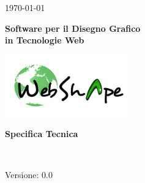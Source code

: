 \usepackage{multirow}
\title{\TITOLODOC}
\author{Dal Bosco Davide}



\renewcommand{\insertversion}{0.0} %
\renewcommand{\TITOLODOC}{Specifica Tecnica} %
\renewcommand{\glosspath}{.\glossario} %

\begin{titlepage}
\begin{center}
	\begin{Large}	\today \end{Large}
\end{center}

\vspace{20pt}

\begin{center}
	\begin{Huge}
				\textbf{\ajax}
	\end{Huge}
\end{center}			

\begin{center}
	\begin{large}
				\textbf{Software per il Disegno Grafico\\ in Tecnologie Web}
	\end{large}
\end{center}			

\vspace{20pt}

\begin{center}
\includegraphics[width=150pt]{../logo/logo}
\end{center}

\vspace{170pt}
\begin{center} %
	\begin{Huge}
				\textbf{\TITOLODOC}
	\end{Huge}
			\\
\end{center}
\vspace{190pt}
\begin{center}
Versione: \insertversion
\end{center}
\end{titlepage}

